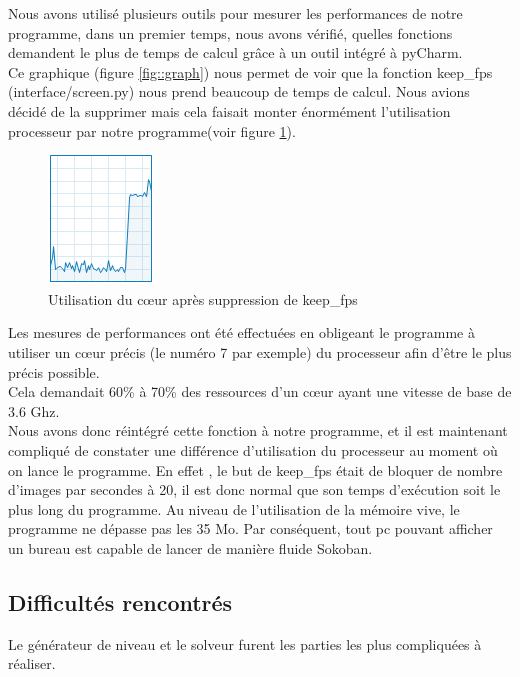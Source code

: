 \documentclass[a4paper,12pt]{article}
\begin{document}
Nous avons utilisé plusieurs outils pour mesurer les performances de notre programme, dans un premier temps, nous avons vérifié, quelles fonctions demandent le plus de temps de calcul grâce à un outil intégré à pyCharm.\\
Ce graphique (figure \ref{fig::graph}) nous permet de voir que la fonction keep\_fps (interface/screen.py) nous prend beaucoup de temps de calcul. Nous avions décidé de la supprimer mais cela faisait monter énormément l'utilisation processeur par notre programme(voir figure \ref{figure::forteconso}).

\begin{figure}[H]
 \centering
 \includegraphics{Illustrations/gestionnaire_tache_forte_conso.png}
\caption{Utilisation du cœur après suppression de keep\_fps}
\label{figure::forteconso}
\end{figure}

Les mesures de performances ont été effectuées en obligeant le programme à utiliser un cœur précis (le numéro 7 par exemple) du processeur afin d'être le plus précis possible.\\

Cela demandait 60\% à 70\% des ressources d'un cœur ayant une vitesse de base de 3.6 Ghz.\\
Nous avons donc réintégré cette fonction à notre programme, et il est maintenant compliqué de constater une différence d'utilisation du processeur au moment où on lance le programme. En effet , le but de keep\_fps était de bloquer de nombre d'images par secondes à 20, il est donc normal que son temps d’exécution soit le plus long du programme. Au niveau de l'utilisation de la mémoire vive, le programme ne dépasse pas les 35 Mo.
Par conséquent, tout pc pouvant afficher un bureau est capable de lancer de manière fluide Sokoban.


\subsection{Difficultés rencontrés}

Le générateur de niveau et le solveur furent les parties les plus compliquées à réaliser.
\end{document}

